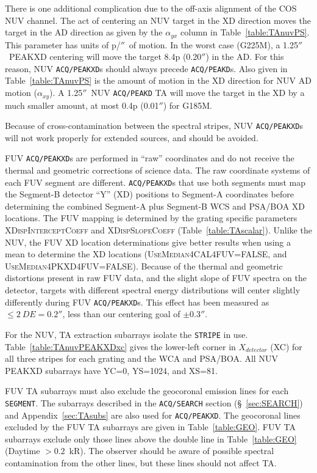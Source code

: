 \documentclass[12pt]{article}
\newcommand{\arcsec}{\ensuremath{''}}
\begin{document}
There is one additional complication due to the off-axis alignment of the COS NUV channel.
The act of centering an NUV target in the XD direction moves the target in the AD direction
as given by the $\alpha_{yx}$ column in Table~\ref{table:TAnuvPS}. This parameter has units
of p/\arcsec\ of motion. In the worst case (G225M), a 1.25\arcsec\ PEAKXD centering will move the target 8.4p (0.20\arcsec)
in the AD. For this reason, NUV \texttt{ACQ/PEAKXD}s should always precede \texttt{ACQ/PEAKD}s. Also given in
Table~\ref{table:TAnuvPS} is the amount of motion in the XD direction for NUV AD motion
($\alpha_{xy}$). A 1.25\arcsec\ NUV \texttt{ACQ/PEAKD} TA will move the target in the XD by a much smaller amount,
at most 0.4p (0.01\arcsec) for G185M.

Because of cross-contamination between the spectral stripes,
NUV \texttt{ACQ/PEAKXD}s will not work properly for extended sources, and should be avoided.\clearpage

FUV \texttt{ACQ/PEAKXD}s are performed in ``raw'' coordinates and do not receive the thermal and geometric corrections of
science data. The raw coordinate systems of each FUV segment are different.
\texttt{ACQ/PEAKXD}s that use both segments must map the Segment-B detector ``Y'' (XD)
positions to Segment-A coordinates before determining the
combined Segment-A plus Segment-B WCS and PSA/BOA XD locations.
The FUV mapping is determined by the grating specific parameters \textsc{XDispInterceptCoeff}
and \textsc{XDispSlopeCoeff} (Table~\ref{table:TAscalar}).
Unlike the NUV, the FUV XD location determinations
give better results when using a mean to determine the XD locations (\textsc{UseMedian4CAL4FUV=FALSE},
and \textsc{UseMedian4PKXD4FUV=FALSE}). Because of the thermal and geometric distortions present
in raw FUV data, and the slight slope of FUV spectra on the detector, targets with different spectral
energy distributions will center slightly differently during FUV \texttt{ACQ/PEAKXD}s. This effect has been
measured as {$\leq2~DE = 0.2$\arcsec}, less than our centering goal of $\pm0.3$\arcsec.

For the NUV, TA extraction subarrays isolate the \texttt{STRIPE} in use.
Table~\ref{table:TAnuvPEAKXDxc} gives the lower-left corner in $X_{detector}$ (XC) for all three stripes
for each grating and the WCA and PSA/BOA. All NUV PEAKXD subarrays have YC=0, YS=1024, and XS=81.

FUV TA subarrays must also exclude the geocoronal emission lines for each \texttt{SEGMENT}.
The subarrays described in the \texttt{ACQ/SEARCH} section (\S~\ref{sec:SEARCH}) and Appendix~\ref{sec:TAsubs} are also used for \texttt{ACQ/PEAKXD}.
The geocoronal lines excluded by the FUV TA subarrays are given in Table~\ref{table:GEO}.
FUV TA subarrays exclude only those lines above the double line in Table~\ref{table:GEO} (Daytime $> 0.2$~kR).
The observer should be aware of possible spectral contamination from the other lines, but these lines should not affect TA.
\end{document}
